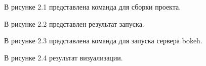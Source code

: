 \par В рисунке 2.1 представлена команда для сборки проекта.
\par В рисунке 2.2 представлен результат запуска.
\par В рисунке 2.3 представлена команда для запуска сервера bokeh.
\par В рисунке 2.4 результат визуализации.
\newpage